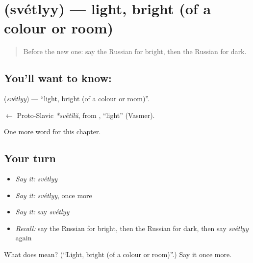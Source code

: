 \section[\texorpdfstring{\ru{светлый} (svétlyy)}{светлый (svétlyy)}]{ (svétlyy) — light, bright (of a colour or room)}

\label{lesson:RU-C244-svetlyy}



\begin{quote}
Before the new one: say the Russian for bright, then the Russian for dark.
\end{quote}

\subsection*{You'll want to know: }
\textbf{} (\emph{svétlyy}) — \textquotedblleft{}light, bright (of a colour or room)\textquotedblright{}.

\begin{cousinweb}
\textbf{} $\leftarrow$ Proto-Slavic \emph{*světĭlŭ}, from \emph{}, \textquotedblleft{}light\textquotedblright{} (Vasmer).
\end{cousinweb}

\begin{grammarlens}[title={What you've built}]
One more word for this chapter.
\end{grammarlens}

\subsection*{Your turn}
\begin{itemize}
\raggedright
  \item \emph{Say it:} \emph{svétlyy}
  \item \emph{Say it:} \emph{svétlyy}, once more
  \item \emph{Say it:} say \emph{svétlyy}
  \item \emph{Recall:} say the Russian for bright, then the Russian for dark, then say \emph{svétlyy} again
\end{itemize}

\begin{tcolorbox}[breakable,colback=teal!4,colframe=teal!35!black,title={Before you move on}]
What does  mean? (\textquotedblleft{}Light, bright (of a colour or room)\textquotedblright{}.) Say it once more.
\end{tcolorbox}
